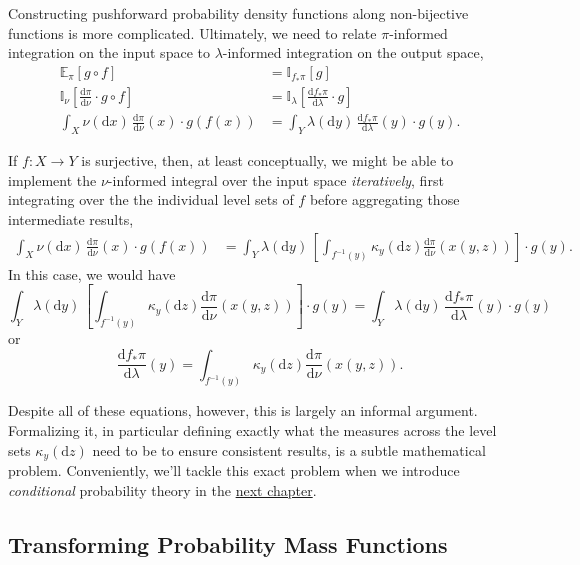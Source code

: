 \documentclass[
  letterpaper,
  DIV=11,
  numbers=noendperiod]{scrartcl}
\begin{document}
Constructing pushforward probability density functions along
non-bijective functions is more complicated. Ultimately, we need to
relate \(\pi\)-informed integration on the input space to
\(\lambda\)-informed integration on the output space, \begin{align*}
\mathbb{E}_{\pi}[g \circ f]
&=
\mathbb{I}_{f_{*} \pi}[g]
\\
\mathbb{I}_{\nu} \left[
\frac{ \mathrm{d} \pi }{ \mathrm{d} \nu } \cdot g \circ f
\right]
&=
\mathbb{I}_{\lambda} \left[
\frac{ \mathrm{d} f_{*} \pi }{ \mathrm{d} \lambda } \cdot g
\right]
\\
\int_{X} \nu(\mathrm{d}x) \,
\frac{ \mathrm{d} \pi }{ \mathrm{d} \nu }(x) \cdot g(f(x))
&=
\int_{Y} \lambda(\mathrm{d}y) \,
\frac{ \mathrm{d} f_{*} \pi }{ \mathrm{d} \lambda }(y)
\cdot g(y).
\end{align*}

If \(f: X \rightarrow Y\) is surjective, then, at least conceptually, we
might be able to implement the \(\nu\)-informed integral over the input
space \emph{iteratively}, first integrating over the the individual
level sets of \(f\) before aggregating those intermediate results,
\begin{align*}
\int_{X} \nu(\mathrm{d}x) \,
\frac{ \mathrm{d} \pi }{ \mathrm{d} \nu }(x) \cdot g(f(x))
&=
\int_{Y} \lambda(\mathrm{d}y) \,
\left[
\int_{f^{-1}(y)} \kappa_{y}(\mathrm{d}z)
\frac{ \mathrm{d} \pi }{ \mathrm{d} \nu }(x(y, z))
\right] \cdot g(y).
\end{align*} In this case, we would have \[
\int_{Y} \lambda(\mathrm{d}y) \,
\left[
\int_{f^{-1}(y)} \kappa_{y}(\mathrm{d}z)
\frac{ \mathrm{d} \pi }{ \mathrm{d} \nu }(x(y, z))
\right] \cdot g(y)
=
\int_{Y} \lambda(\mathrm{d}y) \,
\frac{ \mathrm{d} f_{*} \pi }{ \mathrm{d} \lambda }(y) \cdot g(y)
\] or \[
\frac{ \mathrm{d} f_{*} \pi }{ \mathrm{d} \lambda }(y)
=
\int_{f^{-1}(y)} \kappa_{y}(\mathrm{d}z)
\frac{ \mathrm{d} \pi }{ \mathrm{d} \nu }(x(y, z)).
\]

Despite all of these equations, however, this is largely an informal
argument. Formalizing it, in particular defining exactly what the
measures across the level sets \(\kappa_{y}(\mathrm{d}z)\) need to be to
ensure consistent results, is a subtle mathematical problem.
Conveniently, we'll tackle this exact problem when we introduce
\emph{conditional} probability theory in the
\href{http://www.symplectomorphic.com/assets/chapters_html/conditional_probability_theory_1.html}{next
chapter}.

\subsection{Transforming Probability Mass
Functions}\label{transforming-probability-mass-functions}
\end{document}
